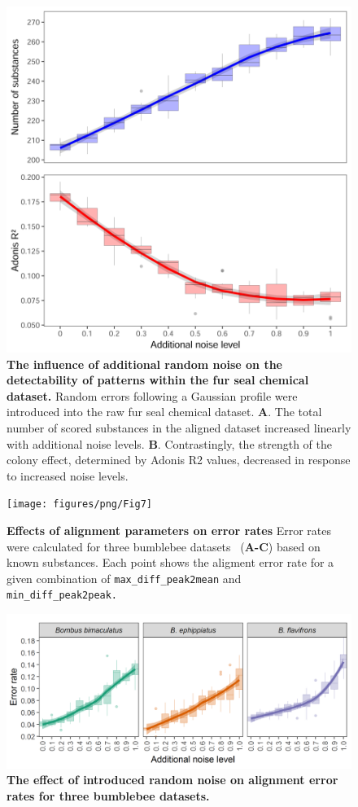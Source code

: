\documentclass[10pt,letterpaper]{article}
\begin{document}
\newpage
\begin{figure}[htbp]
\centering
\includegraphics[width = 14cm]{figures/png/Fig6}
\caption{\textbf{The influence of additional random noise on the detectability of patterns within the fur seal chemical dataset.}
Random errors following a Gaussian profile were introduced into the raw fur seal chemical dataset. \textbf{A}. The total number of scored substances in the aligned dataset increased linearly with additional noise levels. \textbf{B}. Contrastingly, the strength of the colony effect, determined by Adonis R2 values, decreased in response to increased noise levels.}
\label{Fig:Fig6}
\end{figure} 

\newpage
\begin{figure}[htbp]
\centering
\texttt{[image: figures/png/Fig7]}
\caption{\textbf{Effects of alignment parameters on error rates}
Error rates were calculated for three bumblebee datasets~\cite{Dellicour.2013}  (\textbf{A-C}) based on known substances. Each point shows the aligment error rate for a given combination of \texttt{max\_diff\_peak2mean} and \texttt{min\_diff\_peak2peak.}}
\label{Fig:Fig7}
\end{figure} 

\newpage
\begin{figure}[htbp]
\centering
\includegraphics[width = 14cm]{figures/png/Fig8}
\caption{\textbf{The effect of introduced random noise on alignment error rates for three bumblebee datasets.}}
\label{Fig:Fig8}
\end{figure} 
\end{document}
